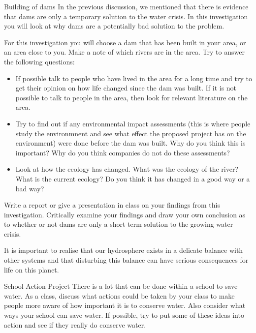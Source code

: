             \begin{Investigation}{Building of dams}
            \nopagebreak
\label{m38138*id0128031}In the previous discussion, we mentioned that there is evidence that dams are only a temporary solution to the water crisis. In this investigation you will look at why dams are a potentially bad solution to the problem. 
\par 
\label{m38138*id473692}For this investigation you will choose a dam that has been built in your area, or an area close to you. Make a note of which rivers are in the area. Try to answer the following questions:
\label{m38138*id774}\begin{itemize}[noitemsep]
            \label{m38138*id034582}\item If possible talk to people who have lived in the area for a long time and try to get their opinion on how life changed since the dam was built. If it is not possible to talk to people in the area, then look for relevant literature on the area.
\label{m38138*id08323}\item Try to find out if any environmental impact assessments (this is where people study the environmnent and see what effect the proposed project has on the environment) were done before the dam was built. Why do you think this is important? Why do you think companies do not do these assessments? 
\label{m38138*id0832346}\item 
Look at how the ecology has changed. What was the ecology of the river? What is the current ecology? Do you think it has changed in a good way or a bad way?
\end{itemize}
        \par 

\label{m38138*id08322432}
Write a report or give a presentation in class on your findings from this investigation. Critically examine your findings and draw your own conclusion as to whether or not dams are only a short term solution to the growing water crisis.
\par \end{Investigation}
      \label{m38138*id342412}It is important to realise that our hydrosphere exists in a delicate balance with other systems and that disturbing this balance can have serious consequences for life on this planet.\par 
\label{m38138*secfhsst!!!underscore!!!id1065}
            \begin{project}{School Action Project
      }
            \nopagebreak
      \label{m38138*id342430}There is a lot that can be done within a school to save water. As a class, discuss what actions could be taken by your class to make people more aware of how important it is to conserve water. Also consider what ways your school can save water. If possible, try to put some of these ideas into action and see if they really do conserve water.
 \par 
\end{project}
